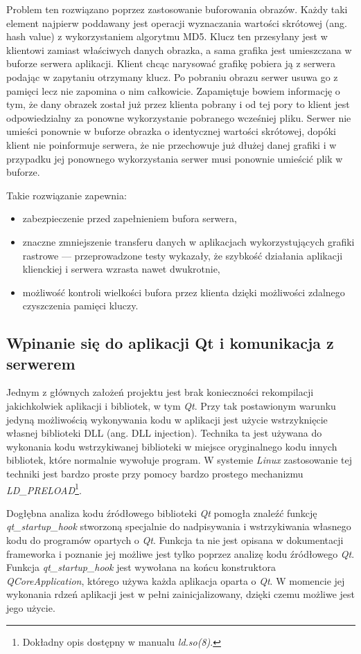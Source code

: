Problem ten rozwiązano poprzez zastosowanie buforowania obrazów. Każdy taki element najpierw poddawany jest operacji wyznaczania wartości skrótowej (ang. hash value) z wykorzystaniem algorytmu MD5. Klucz ten przesyłany jest w klientowi zamiast właściwych danych obrazka, a sama grafika jest umieszczana w buforze serwera aplikacji. Klient chcąc narysować grafikę pobiera ją z serwera podając w zapytaniu otrzymany klucz. Po pobraniu obrazu serwer usuwa go z pamięci lecz nie zapomina o nim całkowicie. Zapamiętuje bowiem informację o tym, że dany obrazek został już przez klienta pobrany i od tej pory to klient jest odpowiedzialny za ponowne wykorzystanie pobranego wcześniej pliku. Serwer nie umieści ponownie w buforze obrazka o identycznej wartości skrótowej, dopóki klient nie poinformuje serwera, że nie przechowuje już dłużej danej grafiki i w przypadku jej ponownego wykorzystania serwer musi ponownie umieścić plik w buforze. 

Takie rozwiązanie zapewnia:
\begin{itemize}
\item zabezpieczenie przed zapełnieniem bufora serwera,
\item znaczne zmniejszenie transferu danych w aplikacjach wykorzystujących grafiki rastrowe --- przeprowadzone testy wykazały, że szybkość działania aplikacji klienckiej i serwera wzrasta nawet dwukrotnie,
\item możliwość kontroli wielkości bufora przez klienta dzięki możliwości zdalnego czyszczenia pamięci kluczy.
\end{itemize}

\subsection{Wpinanie się do aplikacji Qt i komunikacja z serwerem}
Jednym z głównych założeń projektu jest brak konieczności rekompilacji jakichkolwiek aplikacji i bibliotek, w tym \emph{Qt}. Przy tak postawionym warunku jedyną możliwością wykonywania kodu w aplikacji jest użycie wstrzyknięcie własnej biblioteki DLL (ang. DLL injection). Technika ta jest używana do wykonania kodu wstrzykiwanej biblioteki w miejsce oryginalnego kodu innych bibliotek, które normalnie wywołuje program. W systemie \emph{Linux} zastosowanie tej techniki jest bardzo proste przy pomocy bardzo prostego mechanizmu \emph{LD\_PRELOAD}\footnote{Dokładny opis dostępny w manualu \emph{ld.so(8)}.}.

Dogłębna analiza kodu źródłowego biblioteki \emph{Qt} pomogła znaleźć funkcję \emph{qt\_startup\_hook} stworzoną specjalnie do nadpisywania i  wstrzykiwania własnego kodu do programów opartych o \emph{Qt}.
Funkcja ta nie jest opisana w dokumentacji frameworka i poznanie jej możliwe jest tylko poprzez analizę kodu źródłowego \emph{Qt}. Funkcja \emph{qt\_startup\_hook} jest wywołana na końcu konstruktora \emph{QCoreApplication}, którego używa każda aplikacja oparta o \emph{Qt}. W momencie jej wykonania rdzeń aplikacji jest w pełni zainicjalizowany, dzięki czemu możliwe jest jego użycie.

